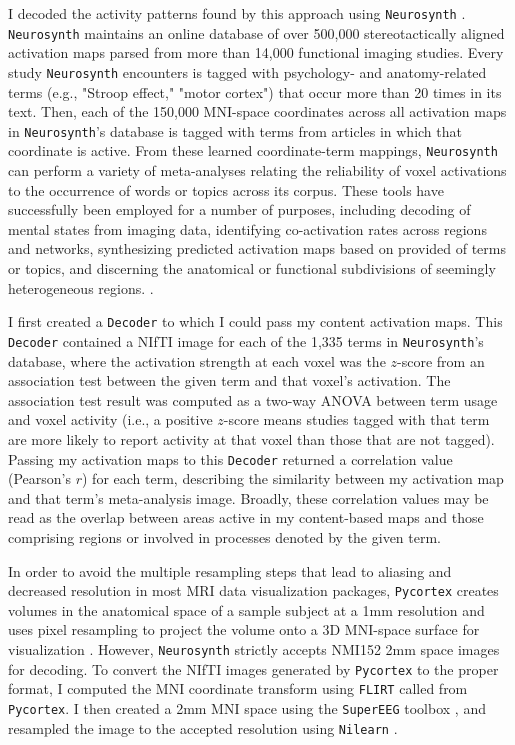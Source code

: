 \documentclass{article}
\begin{document}
I decoded the activity patterns found by this approach using \texttt{Neurosynth} \citep{YarkEtal11}.  \texttt{Neurosynth} maintains an online database of over 500,000 stereotactically aligned activation maps parsed from more than 14,000 functional imaging studies.  Every study \texttt{Neurosynth} encounters is tagged with psychology- and anatomy-related terms (e.g., "Stroop effect," "motor cortex") that occur more than 20 times in its text.  Then, each of the 150,000 MNI-space coordinates across all activation maps in \texttt{Neurosynth}'s database is tagged with terms from articles in which that coordinate is active.  From these learned coordinate-term mappings, \texttt{Neurosynth} can perform a variety of meta-analyses relating the reliability of voxel activations to the occurrence of words or topics across its corpus.  These tools have successfully been employed for a number of purposes, including decoding of mental states from imaging data, identifying co-activation rates across regions and networks, synthesizing predicted activation maps based on provided of terms or topics, and discerning the anatomical or functional subdivisions of seemingly heterogeneous regions. \citep{Pold11,ChanEtal12,DelaEtal16,RubiEtal17}.

I first created a \texttt{Decoder} to which I could pass my content activation maps.  This \texttt{Decoder} contained a NIfTI image for each of the 1,335 terms in \texttt{Neurosynth}'s database, where the activation strength at each voxel was the $z$-score from an association test between the given term and that voxel's activation.  The association test result was computed as a two-way ANOVA between term usage and voxel activity (i.e., a positive $z$-score means studies tagged with that term are more likely to report activity at that voxel than those that are not tagged).  Passing my activation maps to this \texttt{Decoder} returned a correlation value (Pearson's $r$) for each term, describing the similarity between my activation map and that term's meta-analysis image.  Broadly, these correlation values may be read as the overlap between areas active in my content-based maps and those comprising regions or involved in processes denoted by the given term.  

In order to avoid the multiple resampling steps that lead to aliasing and decreased resolution in most MRI data visualization packages, \texttt{Pycortex} creates volumes in the anatomical space of a sample subject at a 1mm resolution and uses pixel resampling to project the volume onto a 3D MNI-space surface for visualization \citep{GaoEtal15}.  However, \texttt{Neurosynth} strictly accepts NMI152 2mm space images for decoding.  To convert the NIfTI images generated by \texttt{Pycortex} to the proper format, I computed the MNI coordinate transform using \texttt{FLIRT} \citep{FiscMode03} called from \texttt{Pycortex}.  I then created a 2mm MNI space using the \texttt{SuperEEG} toolbox \citep{OwenEtal18}, and resampled the image to the accepted resolution using \texttt{Nilearn} \citep{AbraEtal14}.  
\FloatBarrier
\pagebreak
\end{document}
